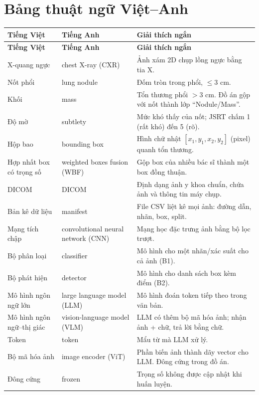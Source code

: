 \section{Bảng thuật ngữ Việt--Anh}
\label{sec:glossary}

\begin{center}
\small
\begin{longtable}{@{}P{3.6cm}P{3.6cm}P{7.4cm}@{}}
\toprule
\textbf{Tiếng Việt} & \textbf{Tiếng Anh} & \textbf{Giải thích ngắn} \\
\midrule\endfirsthead
\toprule
\textbf{Tiếng Việt} & \textbf{Tiếng Anh} & \textbf{Giải thích ngắn} \\
\midrule\endhead
X-quang ngực & chest X-ray (CXR) & Ảnh xám 2D chụp lồng ngực bằng tia X. \\
Nốt phổi & lung nodule & Đốm tròn trong phổi, $\le 3$ cm. \\
Khối & mass & Tổn thương phổi $> 3$ cm. Đồ án gộp với nốt thành lớp ``Nodule/Mass''. \\
Độ mờ & subtlety & Mức khó thấy của nốt; JSRT chấm 1 (rất khó) đến 5 (rõ). \\
Hộp bao & bounding box & Hình chữ nhật $[x_1, y_1, x_2, y_2]$ (pixel) quanh tổn thương. \\
Hợp nhất box có trọng số & weighted boxes fusion (WBF) & Gộp box của nhiều bác sĩ thành một box đồng thuận. \\
DICOM & DICOM & Định dạng ảnh y khoa chuẩn, chứa ảnh và thông tin máy chụp. \\
Bản kê dữ liệu & manifest & File CSV liệt kê mọi ảnh: đường dẫn, nhãn, box, split. \\
Mạng tích chập & convolutional neural network (CNN) & Mạng học đặc trưng ảnh bằng bộ lọc trượt. \\
Bộ phân loại & classifier & Mô hình cho một nhãn/xác suất cho cả ảnh (B1). \\
Bộ phát hiện & detector & Mô hình cho danh sách box kèm điểm (B2). \\
Mô hình ngôn ngữ lớn & large language model (LLM) & Mô hình đoán token tiếp theo trong văn bản. \\
Mô hình ngôn ngữ--thị giác & vision-language model (VLM) & LLM có thêm bộ mã hóa ảnh; nhận ảnh + chữ, trả lời bằng chữ. \\
Token & token & Mẩu từ mà LLM xử lý. \\
Bộ mã hóa ảnh & image encoder (ViT) & Phần biến ảnh thành dãy vector cho LLM. Đông cứng trong đồ án. \\
Đông cứng & frozen & Trọng số không được cập nhật khi huấn luyện. \\

\end{longtable}
\end{center}
